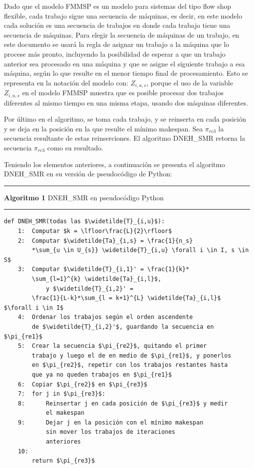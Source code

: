 \documentclass{article}
\begin{document}
Dado que el modelo FMMSP es un modelo para sistemas del tipo flow shop flexible, cada trabajo sigue una secuencia de máquinas, es decir, en este modelo cada solución es una secuencia de trabajos en donde cada trabajo tiene una secuencia de máquinas. Para elegir la secuencia de máquinas de un trabajo, en este documento se usará la regla de asignar un trabajo a la máquina que lo procese más pronto, incluyendo la posibilidad de esperar a que un trabajo anterior sea procesado en una máquina y que se asigne el siguiente trabajo a esa máquina, según lo que resulte en el menor tiempo final de procesamiento. Esto se representa en la notación del modelo con: $Z_{i, u, s}$, porque el uso de la variable $Z_{i, u, s}$ en el modelo FMMSP muestra que es posible procesar dos trabajos diferentes al mismo tiempo en una misma etapa, usando dos máquinas diferentes.

\vspace{\baselineskip}
Por último en el algoritmo, se toma cada trabajo, y se reinserta en cada posición y se deja en la posición en la que resulte el mínimo makespan. Sea $\pi_{re3}$ la secuencia resultante de estas reinserciones. El algoritmo DNEH\_SMR retorna la secuencia $\pi_{re3}$ como su resultado. \autocite{algMNIG}

\vspace{\baselineskip}
Teniendo los elementos anteriores, a continuación se presenta el algoritmo DNEH\_SMR en su versión de pseudocódigo de Python:

\pagebreak

\noindent\noindent
\rule{\linewidth}{0.4pt}

\textbf{Algoritmo 1} DNEH\_SMR en pseudocódigo Python

\noindent\noindent
\rule{\linewidth}{0.4pt}

\begin{lstlisting}[mathescape=true]
    def DNEH_SMR(todas las $\widetilde{T}_{i,u}$):
    1:  Computar $k = \lfloor\frac{L}{2}\rfloor$
    2:  Computar $\widetilde{Ta}_{i,s} = \frac{1}{n_s}
        *\sum_{u \in U_{s}} \widetilde{T}_{i,u} \forall i \in I, s \in S$
    3:  Computar $\widetilde{T}_{i,1}' = \frac{1}{k}*
        \sum_{l=1}^{k} \widetilde{Ta}_{i,l}$, 
            y $\widetilde{T}_{i,2}' = 
        \frac{1}{L-k}*\sum_{l = k+1}^{L} \widetilde{Ta}_{i,l}$ $\forall i \in I$
    4:  Ordenar los trabajos según el orden ascendente 
        de $\widetilde{T}_{i,2}'$, guardando la secuencia en $\pi_{re1}$
    5:  Crear la secuencia $\pi_{re2}$, quitando el primer 
        trabajo y luego el de en medio de $\pi_{re1}$, y ponerlos
        en $\pi_{re2}$, repetir con los trabajos restantes hasta
        que ya no queden trabajos en $\pi_{re1}$
    6:  Copiar $\pi_{re2}$ en $\pi_{re3}$
    7:  for j in $\pi_{re3}$:
    8:      Reinsertar j en cada posición de $\pi_{re3}$ y medir
            el makespan
    9:      Dejar j en la posición con el mínimo makespan
            sin mover los trabajos de iteraciones
            anteriores
    10: 
        return $\pi_{re3}$
\end{lstlisting}
\end{document}
